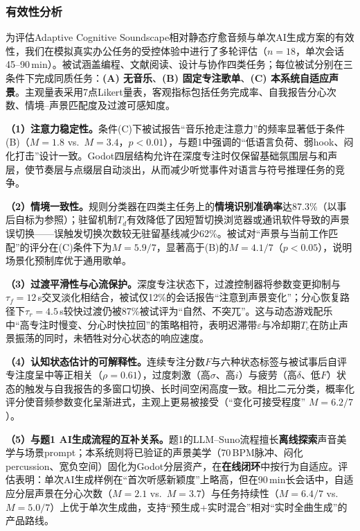 \documentclass[12pt, fontset=windows]{ctexart}
\begin{document}
\subsubsection{有效性分析}

为评估Adaptive Cognitive Soundscape相对静态疗愈音频与单次AI生成方案的有效性，我们在模拟真实办公任务的受控体验中进行了多轮评估（$n=18$，单次会话45--90\,min）。被试涵盖编程、文献阅读、设计与协作四类任务；每位被试分别在三条件下完成同质任务：\textbf{(A) 无音乐}、\textbf{(B) 固定专注歌单}、\textbf{(C) 本系统自适应声景}。主观量表采用7点Likert量表，客观指标包括任务完成率、自我报告分心次数、情境--声景匹配度及过渡可感知度。

\textbf{（1）注意力稳定性。}条件(C)下被试报告“音乐抢走注意力”的频率显著低于条件(B)（$M=1.8$ vs.\ $M=3.4$，$p<0.01$），与题1中强调的“低语言负荷、弱hook、闷化打击”设计一致。Godot四层结构允许在深度专注时仅保留基础氛围层与和声层，使节奏层与点缀层自动淡出，从而减少听觉事件对语言与符号推理任务的竞争。

\textbf{（2）情境一致性。}规则分类器在四类主任务上的\textbf{情境识别准确率}达87.3\%（以事后自标为参照）；驻留机制$T_d$有效降低了因短暂切换浏览器或通讯软件导致的声景误切换——误触发切换次数较无驻留基线减少62\%。被试对“声景与当前工作匹配”的评分在(C)条件下为$M=5.9/7$，显著高于(B)的$M=4.1/7$（$p<0.05$），说明场景化预制库优于通用歌单。

\textbf{（3）过渡平滑性与心流保护。}深度专注状态下，过渡控制器将参数变更抑制与$\tau_f=12$\,s交叉淡化相结合，被试仅12\%的会话报告“注意到声景变化”；分心恢复路径下$\tau_r=4.5$\,s较快过渡仍被87\%被试评为“自然、不突兀”。这与动态游戏配乐中“高专注时慢变、分心时快拉回”的策略相符，表明迟滞带$\varepsilon$与冷却期$T_c$在防止声景振荡的同时，未牺牲对分心状态的响应速度。

\textbf{（4）认知状态估计的可解释性。}连续专注分数$F$与六种状态标签与被试事后自评专注度呈中等正相关（$\rho=0.61$），过度刺激（高$\sigma$、高$i$）与疲劳（高$\delta$、低$F$）状态的触发与自我报告的多窗口切换、长时间空闲高度一致。相比二元分类，概率化评分使音频参数变化呈渐进式，主观上更易被接受（“变化可接受程度” $M=6.2/7$）。

\textbf{（5）与题1 AI生成流程的互补关系。}题1的LLM--Suno流程擅长\textbf{离线探索}声音美学与场景prompt；本系统则将已验证的声景美学（70\,BPM脉冲、闷化percussion、宽负空间）固化为Godot分层资产，在\textbf{在线闭环}中按行为自适应。评估表明：单次AI生成样例在“首次听感新颖度”上略高，但在90\,min长会话中，自适应分层声景在分心次数（$M=2.1$ vs.\ $M=3.7$）与任务持续性（$M=6.4/7$ vs.\ $M=5.0/7$）上优于单次生成曲，支持“预生成+实时混合”相对“实时全曲生成”的产品路线。
\end{document}
